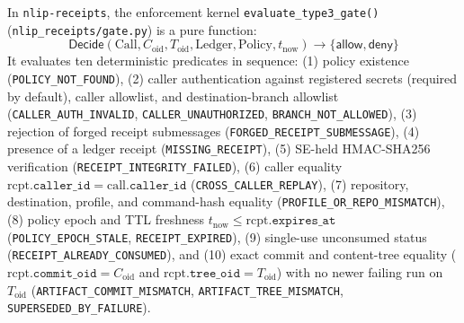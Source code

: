 \documentclass[sigconf,nonacm]{acmart}
\begin{document}
In \texttt{nlip-receipts}, the enforcement kernel \texttt{evaluate\_type3\_gate()} (\texttt{nlip\_receipts/gate.py}) is a pure function:
\[
  \mathsf{Decide}(\text{Call}, C_{\text{oid}}, T_{\text{oid}}, \text{Ledger}, \text{Policy}, t_{\text{now}}) \rightarrow \{\mathsf{allow}, \mathsf{deny}\}
\]
It evaluates ten deterministic predicates in sequence:
(1) policy existence (\texttt{POLICY\_NOT\_FOUND}),
(2) caller authentication against registered secrets (required by default), caller allowlist, and destination-branch allowlist (\texttt{CALLER\_AUTH\_INVALID}, \texttt{CALLER\_UNAUTHORIZED}, \texttt{BRANCH\_NOT\_ALLOWED}),
(3) rejection of forged receipt submessages (\texttt{FORGED\_RECEIPT\_SUBMESSAGE}),
(4) presence of a ledger receipt (\texttt{MISSING\_RECEIPT}),
(5) SE-held HMAC-SHA256 verification (\texttt{RECEIPT\_INTEGRITY\_FAILED}),
(6) caller equality $\text{rcpt}.\texttt{caller\_id} = \text{call}.\texttt{caller\_id}$ (\texttt{CROSS\_CALLER\_REPLAY}),
(7) repository, destination, profile, and command-hash equality (\texttt{PROFILE\_OR\_REPO\_MISMATCH}),
(8) policy epoch and TTL freshness $t_{\text{now}} \le \text{rcpt}.\texttt{expires\_at}$ (\texttt{POLICY\_EPOCH\_STALE}, \texttt{RECEIPT\_EXPIRED}),
(9) single-use unconsumed status (\texttt{RECEIPT\_ALREADY\_CONSUMED}), and
(10) exact commit and content-tree equality ($\text{rcpt}.\texttt{commit\_oid} = C_{\text{oid}}$ and $\text{rcpt}.\texttt{tree\_oid} = T_{\text{oid}}$) with no newer failing run on $T_{\text{oid}}$ (\texttt{ARTIFACT\_COMMIT\_MISMATCH}, \texttt{ARTIFACT\_TREE\_MISMATCH}, \texttt{SUPERSEDED\_BY\_FAILURE}).
\end{document}
